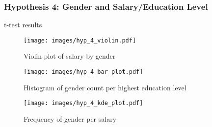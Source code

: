 \subsubsection{Hypothesis 4: Gender and Salary/Education Level}

\begin{table}[H]
    \centering
    \caption{t-test results}
    \label{tab:t-test results}
    \begin{minipage}{\columnwidth}
        
    \end{minipage}
\end{table}

\begin{figure}[H]
    \centering
    \texttt{[image: images/hyp\_4\_violin.pdf]} %
    \caption{Violin plot of salary by gender}
    \label{fig:violin plot of salary by gender}
\end{figure}

\begin{figure}[H]
    \centering
    \texttt{[image: images/hyp\_4\_bar\_plot.pdf]} %
    \caption{Histogram of gender count per highest education level}
    \label{fig:histogram of gender by education level}
\end{figure}

\begin{figure}[H]
    \centering
    \texttt{[image: images/hyp\_4\_kde\_plot.pdf]} %
    \caption{Frequency of gender per salary}
    \label{fig:frequency of gender per salary}
\end{figure}
